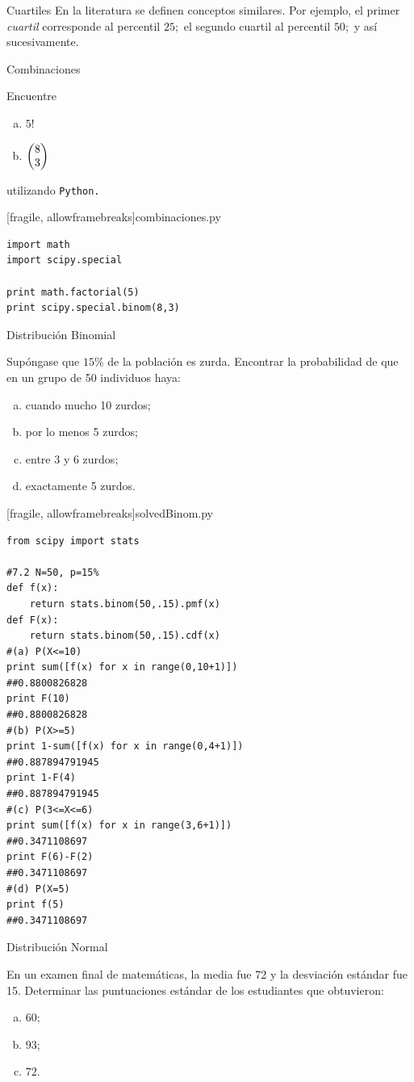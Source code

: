 {Cuartiles}
 En la literatura se definen conceptos similares. Por ejemplo, el primer \emph{cuartil} corresponde al percentil $25;$ el segundo cuartil al percentil $50;$ y así sucesivamente.

{Combinaciones}
 \begin{ejemplo}
  \label{sol:7.1}
  Encuentre
  \begin{enumerate}[(a)]
   \item $5!$
   \item $\begin{pmatrix} 8 \\ 3\end{pmatrix}$
  \end{enumerate}
  utilizando \texttt{Python.}
 \end{ejemplo}


[fragile, allowframebreaks]{combinaciones.py}
 \begin{verbatim}
import math
import scipy.special

print math.factorial(5)
print scipy.special.binom(8,3)
 \end{verbatim}




{Distribución Binomial}
 \begin{ejemplo}
  \label{sol:7.2}
  Supóngase que $15\%$ de la población es zurda. Encontrar la probabilidad de que en un grupo de 50 individuos haya:
  \begin{enumerate}[(a)]
   \item cuando mucho 10 zurdos; 
   \item por lo menos 5 zurdos; 
   \item entre 3 y 6 zurdos; 
   \item exactamente 5 zurdos.
  \end{enumerate}

 \end{ejemplo}


[fragile, allowframebreaks]{solvedBinom.py}
 \begin{verbatim}
from scipy import stats

#7.2 N=50, p=15%
def f(x):
    return stats.binom(50,.15).pmf(x)
def F(x):
    return stats.binom(50,.15).cdf(x)
#(a) P(X<=10)
print sum([f(x) for x in range(0,10+1)])
##0.8800826828
print F(10)
##0.8800826828
#(b) P(X>=5)
print 1-sum([f(x) for x in range(0,4+1)])
##0.887894791945
print 1-F(4)
##0.887894791945
#(c) P(3<=X<=6)
print sum([f(x) for x in range(3,6+1)])
##0.3471108697
print F(6)-F(2)
##0.3471108697
#(d) P(X=5)
print f(5)
##0.3471108697
 \end{verbatim}



{Distribución Normal}
 \begin{ejemplo}
  \label{sol:7.14}
  En un examen final de matemáticas, la media fue 72 y la desviación estándar fue 15. Determinar las puntuaciones estándar de los estudiantes que obtuvieron:
  \begin{enumerate}[(a)]
   \item $60$;
   \item $93$;
   \item $72$.
  \end{enumerate}

 \end{ejemplo}



